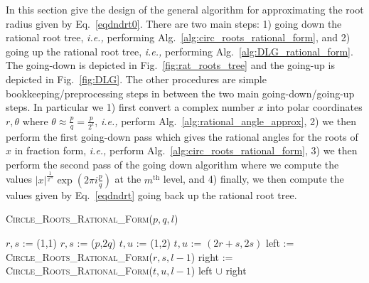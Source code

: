 \documentclass[sigconf]{acmart}
\begin{document}
In this section give the design of the general algorithm for approximating the root radius given by Eq.~\ref{eqdndrt0}.
There are two main steps: 1) going down the rational root tree, \emph{i.e.,} performing Alg.~\ref{alg:circ_roots_rational_form}, and 2) going up the rational root tree, \emph{i.e.,} performing Alg.~\ref{alg:DLG_rational_form}.
The going-down is depicted in Fig.~\ref{fig:rat_roots_tree} and the going-up is depicted in Fig.~\ref{fig:DLG}.
The other procedures are simple bookkeeping/preprocessing steps in between the two main going-down/going-up steps.
In particular we
1) first convert a complex number $x$ into polar coordinates $r,\theta$ where $\theta \approx \frac{p}{q} = \frac{p}{2^\epsilon}$, \emph{i.e.,} perform Alg.~\ref{alg:rational_angle_approx},
2) we then perform the first going-down pass which gives the rational angles for the roots of $x$ in fraction form, \emph{i.e.,} perform Alg.~\ref{alg:circ_roots_rational_form},
3) we then perform the second pass of the going down algorithm where we compute the values $|x|^{\frac{1}{2^m}} \exp(2 \pi i \frac{p}{q})$ at the $m^\mathrm{th}$ level, and
4) finally, we then compute the values given by Eq.~\ref{eqdndrt} going back up the rational root tree.

\begin{algorithm}
   \caption{\textsc{Circle\_Roots\_Rational\_Form}($p,q,l$)}
   \label{alg:circ_roots_rational_form}
\begin{algorithmic}
  \STATE  $r, s$ := (1,1)
\ELSE
  \STATE  $r, s$ := ($p$,$2q$)
\ENDIF
    \STATE $t, u$ := (1,2)
  \ELSE
    \STATE $t, u$ := $(2r+s, 2s)$
  \ENDIF
		  \RETURN [($r,s$),($t,u$)]
		\STATE left  := \textsc{Circle\_Roots\_Rational\_Form}($r,s,l-1$)
		\STATE right := \textsc{Circle\_Roots\_Rational\_Form}($t,u,l-1$)
		\RETURN left $\cup$ right
	\ELSE
		\RETURN  [($p,q$)]
      \ENDIF
\end{algorithmic}
\end{algorithm}
\end{document}
